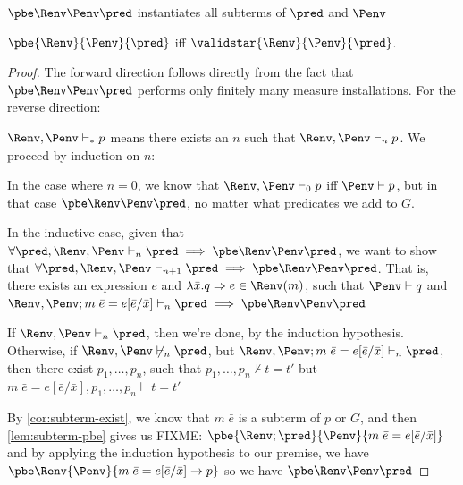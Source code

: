 \begin{lemma}
  $\pbe\Renv\Penv\pred$ instantiates all subterms of $\pred$ and $\Penv$
  \label{lem:subterm-pbe}
\end{lemma}

\begin{theorem}
  $\pbe{\Renv}{\Penv}{\pred}$ iff $\validstar{\Renv}{\Penv}{\pred}$.
\end{theorem}
\begin{proof}
  The forward direction follows directly from the fact that
  $\pbe\Renv\Penv\pred$ performs only finitely many measure installations. For
  the reverse direction:

  \(\Renv, \Penv \vdash_* p\) means there exists an \(n\) such that
  \(\Renv, \Penv \vdash_n p\). We proceed by induction on \(n\):

  In the case where \(n=0\), we know that $\Renv, \Penv \vdash_0 p$ iff
  $\Penv \vdash p$, but in that case $\pbe\Renv\Penv\pred$,
  no matter what predicates we add to $G$.

  In the inductive case, given that
  $\forall \pred, \Renv,\Penv\vdash_n \pred \implies \pbe\Renv\Penv\pred$,
  we want to show that
  $\forall \pred, \Renv,\Penv\vdash_{n+1} \pred \implies \pbe\Renv\Penv\pred$.
  That is, there exists an expression $e$ and
  $\lambda \bar x. q \Rightarrow e \in \Renv(m)$, such that $\Penv \vdash q$ and
  $\Renv,\Penv; m  \; \bar e = e [\bar e/\bar x] \vdash_{n} \pred \implies
  \pbe\Renv\Penv\pred$

  If $\Renv,\Penv\vdash_{n}\pred$, then we're done, by the induction
  hypothesis.  Otherwise, if $\Renv, \Penv \not\vdash_{n}\pred$, but $\Renv,\Penv
  ;m\;\bar e = e [\bar e/\bar x]\vdash_{n}\pred$, then there exist
  $p_1,\ldots,p_n$, such that
  \(p_1, \ldots, p_n \not\vdash  t=t'\) but \(m\;\bar e = e[\bar e /\bar x], p_1, \ldots, p_n \vdash  t=t'\)

  By \ref{cor:subterm-exist},
  we know that $m \;\bar e$ is a subterm of $p$ or $G$,
  and then \ref{lem:subterm-pbe} gives us FIXME:
  $\pbe{\Renv;\pred}{\Penv}{m  \; \bar e = e [\bar e/\bar x]}$
  and by applying the induction hypothesis to our premise, we have
  $\pbe\Renv{\Penv}{m  \; \bar e = e [\bar e/\bar x] \rightarrow p}$
  so we have \(\pbe\Renv\Penv\pred\)
\end{proof}
